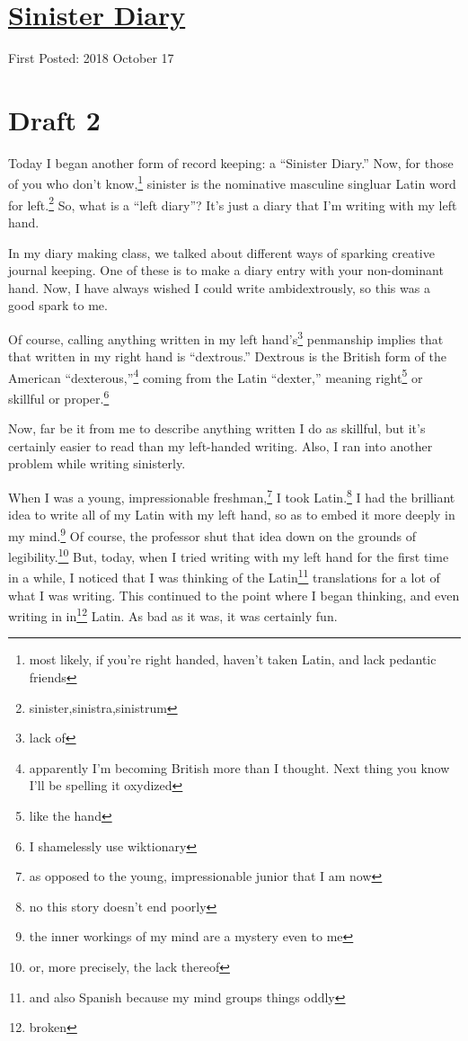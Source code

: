 \documentclass[12pt]{article}[titlepage]
\newcommand{\say}[1]{``#1''}
\newcommand{\1}{\={a}}
\newcommand{\2}{\={e}}
\newcommand{\3}{\={\i}}
\newcommand{\4}{\=o}
\newcommand{\5}{\=u}
\newcommand{\6}{\={A}}
\renewcommand{\,}{\textsuperscript{,}}
\begin{document}
\doublespacing
\section{\href{sinister-diary.html}{Sinister Diary}}
First Posted: 2018 October 17
\section{Draft 2}
Today I began another form of record keeping: a \say{Sinister Diary.}
Now, for those of you who don't know,\footnote{most likely, if you're right handed, haven't taken Latin, and lack pedantic friends} sinister is the nominative masculine singluar Latin word for left.\footnote{sinister,sinistra,sinistrum}
So, what is a \say{left diary}?
It's just a diary that I'm writing with my left hand.

In my diary making class, we talked about different ways of sparking creative journal keeping.
One of these is to make a diary entry with your non-dominant hand.
Now, I have always wished I could write ambidextrously, so this was a good spark to me.

Of course, calling anything written in my left hand's\footnote{lack of} penmanship implies that that written in my right hand is \say{dextrous.}
Dextrous is the British form of the American \say{dexterous,}\footnote{apparently I'm becoming British more than I thought. Next thing you know I'll be spelling it oxydized} coming from the Latin \say{dexter,} meaning right\footnote{like the hand} or skillful or proper.\footnote{I shamelessly use wiktionary}

Now, far be it from me to describe anything written I do as skillful, but it's certainly easier to read than my left-handed writing.
Also, I ran into another problem while writing sinisterly.

When I was a young, impressionable freshman,\footnote{as opposed to the young, impressionable junior that I am now} I took Latin.\footnote{no this story doesn't end poorly}
I had the brilliant idea to write all of my Latin with my left hand, so as to embed it more deeply in my mind.\footnote{the inner workings of my mind are a mystery even to me}
Of course, the professor shut that idea down on the grounds of legibility.\footnote{or, more precisely, the lack thereof}
But, today, when I tried writing with my left hand for the first time in a while, I noticed that I was thinking of the Latin\footnote{and also Spanish because my mind groups things oddly} translations for a lot of what I was writing.
This continued to the point where I began thinking, and even writing in in\footnote{broken} Latin.
As bad as it was, it was certainly fun.
\end{document}
